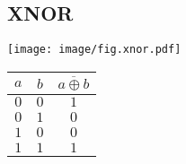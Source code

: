 \subsection*{XNOR}
\begin{minipage}[t][2em][c]{\linewidth}
	\centering
	\texttt{[image: image/fig.xnor.pdf]}
\end{minipage}
\begin{center}
	\begin{tabular}{cc|c}
		\toprule
		$a$ & $b$ & $\overline{a \oplus b}$ \\
		\midrule
		$0$ & $0$ & $1$                     \\
		$0$ & $1$ & $0$                     \\
		$1$ & $0$ & $0$                     \\
		$1$ & $1$ & $1$                     \\
		\bottomrule
	\end{tabular}
\end{center}
